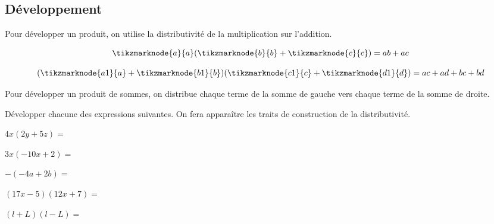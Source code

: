 \documentclass{poly}
\begin{document}
\subsection{Développement}
Pour développer un produit, on utilise la distributivité de la multiplication sur l'addition.


\begin{equation*}
\tikzmarknode{a}{a}(\tikzmarknode{b}{b}+\tikzmarknode{c}{c}) = ab + ac
\end{equation*}

\begin{equation*}
(\tikzmarknode{a1}{a} + \tikzmarknode{b1}{b})(\tikzmarknode{c1}{c} + \tikzmarknode{d1}{d}) =
ac + ad + bc + bd
\end{equation*}
\begin{tcolorbox}
Pour développer un produit de sommes, on \og distribue \fg chaque terme de la somme de gauche vers chaque terme de la somme de droite.
\end{tcolorbox}
\begin{example}
Développer chacune des expressions suivantes. On fera apparaître les traits de construction de la distributivité.
\begin{alphaquestions}
\item $4x(2y + 5z) = $ \answerline
\item $3x(-10x + 2) = $ \answerline
\item $-(-4a + 2b) = $ \answerline
\item $(17x - 5)(12x + 7) = $ \answerline
\item $(l + L)(l - L) = $ \answerline
\end{alphaquestions}
\end{example}

\newpage
\end{document}
